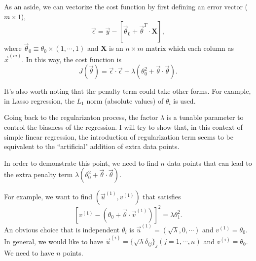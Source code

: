 As an aside, we can vectorize the cost function by first defining an error vector ($m\times1$),
\begin{equation}
\vec\epsilon = \vec y - \left[\vec\theta_0+\vec\theta^T\cdot\mathbf{X}\right],
\end{equation}
where $\vec\theta_0\equiv\theta_0\times(1, \cdots, 1)$ and $\mathbf{X}$ is an $n\times m$ matrix which each column as $\vec x^{(m)}$. In this way, the cost function
is
\begin{equation}
J(\vec\theta) = \vec\epsilon\cdot\vec\epsilon + \lambda(\theta_0^2+\vec\theta\cdot\vec\theta).
\end{equation}

It's also worth noting that the penalty term could take other forms. For example, in Lasso regression, the $L_1$ norm (absolute values) of $\theta_i$ is used.

Going back to the regularizaton process, the factor $\lambda$ is a tunable parameter to control the biasness of the regression. I will try to show that, in this
context of simple linear regression, the introduction of regularization term seems to be equivalent to the ``artificial" addition of extra data points.

In order to demonstrate this point, we need to find $n$ data points that can lead to the extra penalty term $\lambda(\theta_0^2+\vec\theta\cdot\vec\theta)$.

For example, we want to find $(\vec u^{(1)}, v^{(1)})$ that satisfies 
\begin{equation}
\left[v^{(1)} - \left(\theta_0 + \vec\theta\cdot\vec v^{(1)}\right)\right]^2 = \lambda\theta_1^2.
\end{equation}
An obvious choice that is independent $\theta_i$ is $\vec u^{(1)} = (\sqrt\lambda, 0, \cdots)$ and $v^{(1)} = \theta_0$.
In general, we would like to have $\vec u^{(i)} = \{\sqrt\lambda\delta_{ij}\}_j (j=1, \cdots, n)$ and $v^{(i)} = \theta_0$\footnotemark{}. We need to have $n$ points. 

